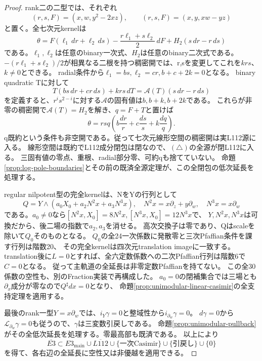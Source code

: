 \documentclass[a4paper,11pt]{ltjsarticle}
\theoremstyle{definition}
\begin{document}
\begin{proof}
rank二の二型では、それぞれ
\[
 (r,s,F)=(x,w,y^2-2xz),\qquad (r,s,F)=(x,y,xw-yz)
\]
と置く。全七次元kernelは
\[
 \theta=F(\ell_1\,dr+\ell_2\,ds)
       -\frac{r\ell_1+s\ell_2}{2}\,dF+H_2(s\,dr-r\,ds)          \tag{\triangle}
\]
である。$\ell_1,\ell_2$は任意のbinary一次式、$H_2$は任意のbinary二次式である。
$-(r\ell_1+s\ell_2)/2$が相異なる二根を持つ稠密開では、r,sを変更してこれを$krs$、$k\ne0$とできる。
radial条件から$\ell_1=b s,\ell_2=c r,b+c+2k=0$となる。
binary quadratic Tに対して
\[
 T(bs\,dr+cr\,ds)+krs\,dT=\mathcal A(T)(s\,dr-r\,ds)
\]
を定義すると、$r^is^{2-i}$に対する$\mathcal A$の固有値は$b,b+k,b+2k$である。
これらが非零の稠密開で$\mathcal A(T)=H_2$を解き、$q=F+T$と置けば
\[
 \theta=rsq\left(b\frac{dr}{r}+c\frac{ds}{s}+k\frac{dq}{q}\right).
\]
q既約という条件も非空開である。従って七次元線形空間の稠密開は実L112源に入る。
線形空間は既約でL112成分閉包は閉なので、$(\triangle)$の全源が閉L112に入る。
三固有値の零点、重根、radial部分零、可約qも捨てていない。
命題\ref{prop:log-pole-boundaries}とその前の既済全源定理が、この全閉包の低次延長を処理する。

regular nilpotent型の完全kernelは、NをYの行列として
\[
 Q=Y\wedge(a_0X_0+a_2N^2x+a_3N^3x),
 \quad N^2x=x\partial_z+y\partial_w,\quad N^3x=x\partial_w
\]
である。$a_0\ne0$なら$[N^2x,X_0]=8N^2x,[N^3x,X_0]=12N^3x$で、
$Y,N^2x,N^3x$は可換だから、後二場の指数で$a_2,a_3$を消せる。
高次交換子は零であり、Qはscaleを除いて$Q_0$そのものとなる。
$Q_0$の全24一次係数に発散零と三次Pfaffian条件を課す行列は階数20、
その完全kernelは四次元translation imageに一致する。
translation後に$L=0$とすれば、全六定数係数への二次Pfaffian行列は階数6で$C=0$となる。
従って主軌道の全延長は非零定数Pfaffianを持てない。
この全30係数の空性も、別のFraction実装で再構成した。
$a_0=0$の閉補集合では三場とも$\partial_x$成分が零なので$Q^\sharp dx=0$となり、
命題\ref{prop:unimodular-linear-casimir}の全支持定理を適用する。

最後のrank一型$Y=x\partial_w$では、$i_Y\gamma=0$と整域性から$i_{\partial_w}\gamma=0$。
$d\gamma=0$から$\mathcal L_{\partial_w}\gamma=0$も従うので、$\gamma$は三変数引戻しである。
命題\ref{prop:unimodular-pullback}がその全低次延長を処理する。零最高部も既済である。
以上により
\[
 \overline{E3}\subset E3_{\mathrm{main}}\cup\overline{L112}
       \cup\{\text{一次Casimir}\}\cup\{\text{引戻し}\}\cup\{0\}
\]
を得て、各右辺の全延長に空性又は非優越を適用できる。
\end{proof}
\end{document}
